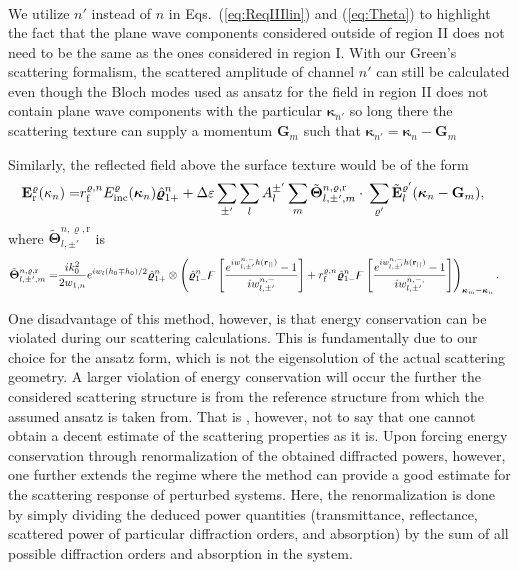 \documentclass[ floatfix,reprint,amsmath,amssymb,aps,prb]{revtex4-1}
\begin{document}
\begin{widetext}
\begin{align}
\end{align}
We utilize $n'$ instead of $n$ in Eqs.~(\ref{eq:ReqIIIlin}) and (\ref{eq:Theta}) to highlight the fact that the plane wave components considered outside of region II does not need to be the same as the ones considered in region I. With our Green's scattering formalism, the scattered amplitude of channel $n'$ can still be calculated even though the Bloch modes used as ansatz for the field in region II does not contain plane wave components with the particular $\boldsymbol{\kappa}_{n'}$ so long there the scattering texture can supply a momentum $\mathbf{G}_m$ such that  $\boldsymbol{\kappa}_{n'}=\boldsymbol{\kappa}_n-\mathbf{G}_m$

Similarly, the reflected field above the surface texture would be of the form
\begin{align}
\mathbf{E}^{\varrho}_{\mathrm{r}}(\kappa_{n})=& r_{\textnormal{f}}^{\varrho,n} E_{\mathrm{inc}}^{\varrho} (\boldsymbol{\kappa}_{n}) \hat{\boldsymbol{\varrho}}_{1+}^{n} + \Delta\varepsilon   \sum_{\pm'} \sum_{l} A^{\pm'}_{l} \sum_{m} \tilde{ \boldsymbol{\Theta}}^{n,\varrho,\mathrm{r}}_{l,\pm',m} \cdot\:  \sum_{\varrho'}  \tilde{\mathbf{E}}^{\varrho'}_{l}(\boldsymbol{\kappa}_{n}-\mathbf{G}_{m}),\label{eq:ReqIlin}
\end{align}
where $\tilde{ \boldsymbol{\Theta}}^{n,\varrho,\mathrm{r}}_{l,\pm'}$ is 
\begin{align}
\tilde{ \boldsymbol{\Theta}}^{n,\varrho,\mathrm{r}}_{l,\pm',m} = &  \frac{ik_{0}^2}{2w_{1,n}}  e^{iw_{l}(h_0 \mp h_0)/2} \hat{\boldsymbol{\varrho}}_{1+}^{n} \otimes \left( \hat{\boldsymbol{\varrho}}_{1-}^{n} \digamma\left[  \frac{ e^{iw^{n,-}_{l,\pm'} h( \mathbf{r_{||} } ) }-1}{iw^{n,-}_{l,\pm'}}\right] + r_{\textnormal{f}}^{\varrho,n} \hat{\boldsymbol{\varrho}}_{1-}^{n} \digamma\left[  \frac{ e^{iw^{n,-}_{l,\pm'} h( \mathbf{r_{||} } ) }-1}{iw^{n,-,}_{l,\pm'}}\right] \right)_{\boldsymbol{\kappa}_m-\boldsymbol{\kappa}_n}. \label{eq:Theta2}
\end{align}
\end{widetext}

One disadvantage of this method, however, is that energy conservation can be violated during our scattering calculations. This is fundamentally due to our choice for the ansatz form, which is not the eigensolution of the actual scattering geometry. A larger violation of energy conservation will occur the further the considered scattering structure is from the reference structure from which the assumed ansatz is taken from. That is , however, not to say that one cannot obtain a decent estimate of the scattering properties as it is. Upon forcing energy conservation through renormalization of the obtained diffracted powers, however, one further extends the regime where the method can provide a good estimate for the scattering response of perturbed systems. Here, the renormalization is done by simply dividing the deduced power quantities (transmittance, reflectance, scattered power of particular diffraction orders, and absorption) by the sum of all possible diffraction orders and absorption in the system.
\end{document}
